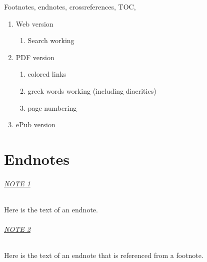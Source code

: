\documentclass[
]{book}
\providecommand{\tightlist}{%
  \setlength{\itemsep}{0pt}\setlength{\parskip}{0pt}}
\begin{document}
Footnotes, endnotes, crossreferences, TOC,

\begin{enumerate}
\def\labelenumi{\arabic{enumi}.}
\tightlist
\item
  Web version

  \begin{enumerate}
  \def\labelenumii{\alph{enumii}.}
  \tightlist
  \item
    Search working
  \end{enumerate}
\item
  PDF version

  \begin{enumerate}
  \def\labelenumii{\alph{enumii}.}
  \tightlist
  \item
    colored links
  \item
    greek words working (including diacritics)
  \item
    page numbering
  \end{enumerate}
\item
  ePub version
\end{enumerate}

\hypertarget{endnotes-1}{%
\chapter*{Endnotes}\label{endnotes-1}}

\hypertarget{en.01}{%
\subparagraph*{\texorpdfstring{\protect\hyperlink{en.01.backlink}{NOTE 1}}{NOTE 1}}\label{en.01}}

Here is the text of an endnote.

\hypertarget{en.02}{%
\subparagraph*{\texorpdfstring{\protect\hyperlink{en.02.backlink}{NOTE 2}}{NOTE 2}}\label{en.02}}

Here is the text of an endnote that is referenced from a footnote.
\end{document}
